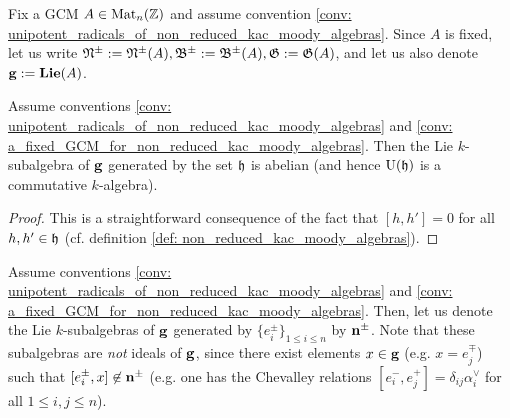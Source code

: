             \begin{convention} \label{conv: a_fixed_GCM_for_non_reduced_kac_moody_algebras}
                Fix a GCM $A \in \mathrm{Mat}_n(\mathbb{Z})$ and assume convention \ref{conv: unipotent_radicals_of_non_reduced_kac_moody_algebras}. Since $A$ is fixed, let us write $\mathfrak{N}^{\pm} := \mathfrak{N}^{\pm}(A), \mathfrak{B}^{\pm} := \mathfrak{B}^{\pm}(A), \mathfrak{G} := \mathfrak{G}(A)$, and let us also denote $\mathbf{g} := \mathbf{Lie}(A)$.
            \end{convention}
            \begin{lemma} \label{lemma: cartan_subalgebras_of_non_reduced_kac_moody_algebras_are_abelian}
                Assume conventions \ref{conv: unipotent_radicals_of_non_reduced_kac_moody_algebras} and \ref{conv: a_fixed_GCM_for_non_reduced_kac_moody_algebras}. Then the Lie $k$-subalgebra of $\mathbf{g}$ generated by the set $\mathfrak{h}$ is abelian (and hence $\mathrm{U}(\mathfrak{h})$ is a commutative $k$-algebra).
            \end{lemma}
                \begin{proof}
                    This is a straightforward consequence of the fact that $[h, h'] = 0$ for all $h, h' \in \mathfrak{h}$ (cf. definition \ref{def: non_reduced_kac_moody_algebras}).
                \end{proof}
            \begin{convention} \label{conv: lower_and_upper_triangular_nilpotent_subalgebras_of_non_reduced_kac_moody_algebras}
                Assume conventions \ref{conv: unipotent_radicals_of_non_reduced_kac_moody_algebras} and \ref{conv: a_fixed_GCM_for_non_reduced_kac_moody_algebras}. Then, let us denote the Lie $k$-subalgebras of $\mathbf{g}$ generated by $\{e_i^{\pm}\}_{1 \leq i \leq n}$ by $\mathbf{n}^{\pm}$. Note that these subalgebras are \textit{not} ideals of $\mathbf{g}$, since there exist elements $x \in \mathbf{g}$ (e.g. $x = e_j^{\mp}$) such that $[e_i^{\pm}, x] \not \in \mathbf{n}^{\pm}$ (e.g. one has the Chevalley relations $[e_i^-, e_j^+] = \delta_{ij} \alpha_i^{\vee}$ for all $1 \leq i, j \leq n$).
            \end{convention}
